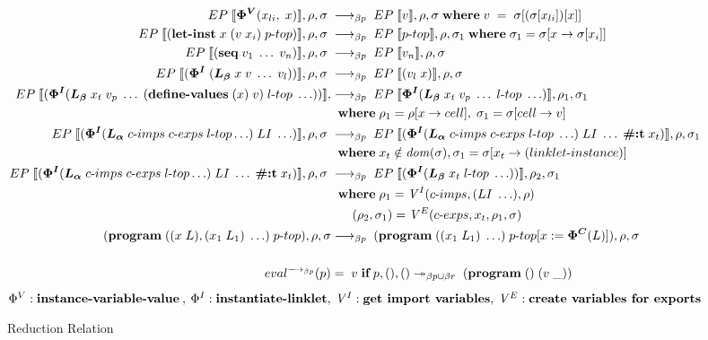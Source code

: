 \documentclass[sigplan,screen,anonymous]{acmart}
\def\dash {\text{-}}
\begin{document}
\begin{figure*}[tbp]
  \begin{align*}
    \redinput{\bm{\Phi^V}(x_{li},\; x)} \rel \redoutput{v}{\rho}{\sigma} \where v\; =\; \sigma[(\sigma[x_{li}])[x]] \\
    \redinput{(\textbf{let\dash inst}\; x\; (v\;x_i)\; p\dash top)} \rel \redoutput{p\dash top}{\rho}{\sigma_1} \where \sigma_1 = \sigma[x\rightarrow \sigma[x_i]] \\
    \redinput{(\textbf{seq}\; v_{1}\; \ldots\; v_{n})} \rel \redoutput{v_{n}}{\rho}{\sigma} \\
    \redinput{(\bm{\Phi^I}\; (\lb\; x\; v\; \ldots\; v_{l}))} \rel \redoutput{(v_{l}\; x)}{\rho}{\sigma} \\
    EP\;\llbracket (\bm{\Phi^I}(\lb\; x_{t}\; v_p\; \ldots\; (\textbf{define\dash values}\; (x)\; v)\; l\dash top\; \ldots)) \rrbracket, \rel \redoutput{\bm{\Phi^I}(\lb\; x_{t}\; v_p\; \ldots\; l\dash top\; \ldots)}{\rho_1}{\sigma_1} \\
    \;          &\;\; \where \rho_1 = \rho[x\rightarrow cell],\; \sigma_1 = \sigma[cell\rightarrow v] \\
    \redinput{(\bm{\Phi^I}(\la\; c\dash imps \; c\dash exps \; l\dash top \ldots)\; LI\; \ldots)} \rel \redoutput{(\bm{\Phi^I}(\la\; c\dash imps \; c\dash exps \; l\dash top\; \ldots)\; LI\; \ldots\; \textbf{\#:t}\; x_{t})}{\rho}{\sigma_1} \\
    \;          &\;\; \where x_t \notin \mathit{dom}(\sigma), \sigma_1 = \sigma[x_t\rightarrow (linklet\dash instance)] \\
    EP\;\llbracket (\bm{\Phi^I}(\la\; c\dash imps \; c\dash exps \; l\dash top \ldots)\; LI\; \ldots\; \textbf{\#:t}\; x_{t}) \rrbracket, \rho, \sigma\; \rel \redoutput{(\bm{\Phi^I}(\lb\; x_{t}\; l\dash top\; \ldots))}{\rho_2}{\sigma_1} \\
    \; &\;\; \where \rho_1 = \mathit{V}^I(c\dash imps, (LI\; \ldots), \rho) \\
    \;          &\;\; \hspace{0.4cm} (\rho_2, \sigma_1) = \mathit{V}^E(c\dash exps, x_t, \rho_1, \sigma) \\
    (\textbf{program}\; ((x\;L),(x_1\;L_1)\;\ldots)\;p\dash top), \rho, \sigma &\longrightarrow_{\beta p}\; (\textbf{program}\; ((x_1\;L_1)\;\ldots)\;p\dash top[x := \bm{\Phi^C}(L)]), \rho, \sigma \\ \\
    eval^{\longrightarrow_{\beta p}}(p) &=\; v\; \textbf{if}\; p, (), () \twoheadrightarrow_{\beta p\cup\beta r} \; (\textbf{program}\; ()\;(v\;\_)) \\
  \end{align*}
  \hfill \footnotesize $\Phi^V : \textbf{instance\dash variable\dash value}\:,\: \Phi^I : \textbf{instantiate\dash linklet},\: \mathit{V}^I : \textbf{get  import variables},\: \mathit{V}^E : \textbf{create variables for exports}$
\caption{Reduction Relation}
\label{fig:reduction}
\end{figure*}
\end{document}
